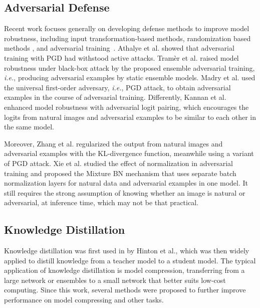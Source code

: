 \documentclass[10pt,twocolumn,letterpaper]{article}
\begin{document}
\subsection{Adversarial Defense}
Recent work focuses generally on developing defense methods to improve model robustness, including input transformation-based methods, randomization based methods \cite{DBLP:conf/iclr/XieWZRY18,DBLP:conf/iclr/DhillonALBKKA18}, and adversarial training~\cite{zhang2019theoretically,DBLP:journals/corr/abs-1803-06373,DBLP:conf/iclr/MadryMSTV18,DBLP:conf/iclr/TramerKPGBM18}. 
Athalye et al. \cite{pmlr-v80-athalye18a} showed that adversarial training with PGD had withstood active attacks. Tram{\`{e}}r et al. \cite{DBLP:conf/iclr/TramerKPGBM18} raised model robustness under black-box attack by the proposed ensemble adversarial training, \emph{i.e.}, producing adversarial examples by static ensemble models. 
Madry et al. \cite{DBLP:conf/iclr/MadryMSTV18} used the universal first-order adversary, {\it i.e.}, PGD attack, to obtain adversarial examples in the course of adversarial training. 
Differently, Kannan et al. \cite{DBLP:journals/corr/abs-1803-06373} enhanced model robustness with adversarial logit pairing, which encourages the logits from natural images and adversarial examples to be similar to each other in the same model. 

Moreover, Zhang et al. \cite{zhang2019theoretically} regularized the output from natural images and adversarial examples with the KL-divergence function, meanwhile using a variant of PGD attack. 
Xie et al. \cite{xie2019intriguing} studied the effect of normalization in adversarial training and proposed the Mixture BN mechanism that uses separate batch normalization layers for natural data and adversarial examples in one model. It still requires the strong assumption of knowing whether an image is natural or adversarial, at inference time, which may not be that practical. 

\subsection{Knowledge Distillation}
Knowledge distillation was first used in \cite{DBLP:journals/corr/HintonVD15} by Hinton et al., which was then widely applied to distill knowledge from a teacher model to a student model. The typical application of knowledge distillation is model compression, transferring from a large network or ensembles to a small network that better suits low-cost computing. Since this work, several methods \cite{Tung_2019_ICCV,DBLP:conf/cvpr/ParkKLC19,DBLP:journals/corr/SauB16,DBLP:conf/iclr/TarvainenV17,DBLP:journals/corr/abs-1710-07535, tian2019crd, Chen_2021_CVPR} were proposed to further improve performance on model compressing and other tasks. 
\end{document}
